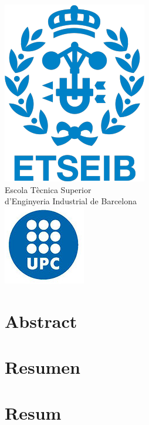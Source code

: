 \documentclass[a4paper, 11pt, titlepage, twoside]{article}
\begin{document}
\begin{titlepage}
\begin{tabular}{l@{ } l}
    \end{tabular}\par
    \vspace{10mm}
    {\centering
    \includegraphics[scale=0.3]{./Icones-ETSEIB-UPC/ETSEIB.png}\\
    {\Large Escola Tècnica Superior \\ d'Enginyeria Industrial de Barcelona}\\
    \vspace{3mm}
    \includegraphics[scale=0.4]{./Icones-ETSEIB-UPC/UPC.PNG}
    \par
    }
    \end{titlepage}

\clearpage
\thispagestyle{empty}
\null\newpage 


\section*{Abstract}\label{Abstract}

\cleardoublepage
\section*{Resumen}\label{Resumen}

\cleardoublepage
\section*{Resum}\label{Resum}

\end{document}
